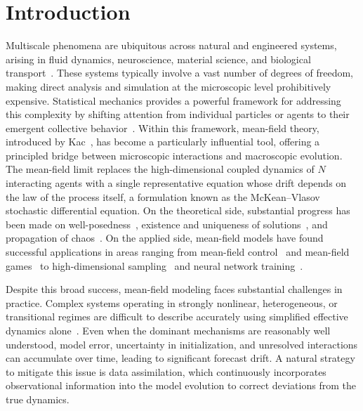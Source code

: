 
\maketitle

\section{Introduction}
Multiscale phenomena are ubiquitous across natural and engineered systems, arising in fluid dynamics, neuroscience, material science, and biological transport~\cite{jost2005dynamical,wiggins2003introduction}. These systems typically involve a vast number of degrees of freedom, making direct analysis and simulation at the microscopic level prohibitively expensive. Statistical mechanics provides a powerful framework for addressing this complexity by shifting attention from individual particles or agents to their emergent collective behavior~\cite{hill2013statistical}. Within this framework, mean-field theory, introduced by Kac~\cite{kac1956foundations,mckean1966class}, has become a particularly influential tool, offering a principled bridge between microscopic interactions and macroscopic evolution. The mean-field limit replaces the high-dimensional coupled dynamics of $N$ interacting agents with a single representative equation whose drift depends on the law of the process itself, a formulation known as the McKean--Vlasov stochastic differential equation. On the theoretical side, substantial progress has been made on well-posedness~\cite{de2020strong,huang2019distribution}, existence and uniqueness of solutions~\cite{mishura2020existence}, and propagation of chaos~\cite{sznitman2006topics,chaintron2021propagation,jabin2017mean}. On the applied side, mean-field models have found successful applications in areas ranging from mean-field control~\cite{buckdahn2017mean} and mean-field games~\cite{ding2022mean} to high-dimensional sampling~\cite{liu2017stein,carrillo2024fisher} and neural network training~\cite{rotskoff2022trainability}.

Despite this broad success, mean-field modeling faces substantial challenges in practice. Complex systems operating in strongly nonlinear, heterogeneous, or transitional regimes are difficult to describe accurately using simplified effective dynamics alone~\cite{sznitman2006topics,jabin2018quantitative,cattiaux2008probabilistic}. Even when the dominant mechanisms are reasonably well understood, model error, uncertainty in initialization, and unresolved interactions can accumulate over time, leading to significant forecast drift. A natural strategy to mitigate this issue is data assimilation, which continuously incorporates observational information into the model evolution to correct deviations from the true dynamics.

